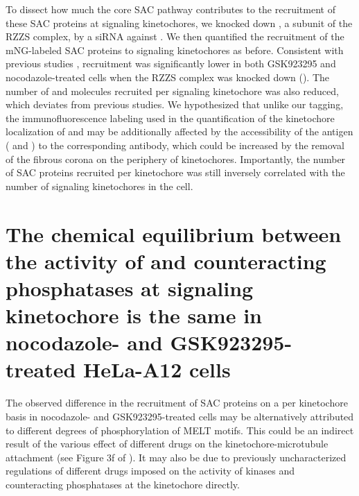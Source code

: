 To dissect how much the core SAC pathway contributes to the recruitment of these SAC proteins at signaling kinetochores, we knocked down , a subunit of the RZZS complex, by a siRNA against . We then quantified the recruitment of the mNG-labeled SAC proteins to signaling kinetochores as before. Consistent with previous studies \cite{CENPELocalization-BUBR1,siROD_Zhang2019},  recruitment was significantly lower in both GSK923295 and nocodazole-treated cells when the RZZS complex was knocked down (). The number of  and  molecules recruited per signaling kinetochore was also reduced, which deviates from previous studies. We hypothesized that unlike our  tagging, the immunofluorescence labeling used in the quantification of the kinetochore localization of  and  \cite{BUBR1_XenopusVSHeLa,siROD_Zhang2019} may be additionally affected by the accessibility of the antigen ( and ) to the corresponding antibody, which could be increased by the removal of the fibrous corona on the periphery of kinetochores. Importantly, the number of SAC proteins recruited per kinetochore was still inversely correlated with the number of signaling kinetochores in the cell.

\section{The chemical equilibrium between the activity of  and counteracting phosphatases at signaling kinetochore is the same in nocodazole- and GSK923295-treated HeLa-A12 cells}

The observed difference in the recruitment of SAC proteins on a per kinetochore basis in nocodazole- and GSK923295-treated cells may be alternatively attributed to different degrees of phosphorylation of MELT motifs. This could be an indirect result of the various effect of different drugs on the kinetochore-microtubule attachment (see Figure 3f of \cite{Rheostat}). It may also be due to previously uncharacterized regulations of different drugs imposed on the activity of kinases and counteracting phosphatases at the kinetochore directly.

